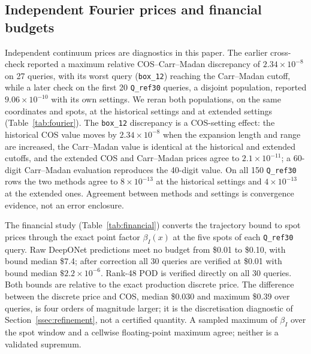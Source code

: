 \documentclass[11pt]{amsart}
\theoremstyle{remark}
\begin{document}


\subsection{Independent Fourier prices and financial budgets}
\label{ssec:fourier-financial}

Independent continuum prices are diagnostics in this paper. The earlier
cross-check reported a maximum relative COS--Carr--Madan discrepancy of
$2.34\times10^{-8}$ on 27 queries, with its worst query (\texttt{box\_12})
reaching the Carr--Madan cutoff, while a later check on the first 20 \texttt{Q\_ref30} queries, a
disjoint population, reported $9.06\times10^{-10}$ with its own settings. We reran both populations, on the same
coordinates and spots, at the historical settings and at extended settings
(Table~\ref{tab:fourier}). The \texttt{box\_12} discrepancy is a COS-setting
effect: the historical COS value moves by $2.34\times10^{-8}$ when the
expansion length and range are increased, the Carr--Madan value is identical
at the historical and extended cutoffs, and the extended COS and
Carr--Madan prices agree to $2.1\times10^{-11}$; a 60-digit Carr--Madan evaluation
reproduces the 40-digit value. On all 150 \texttt{Q\_ref30} rows the two
methods agree to $8\times10^{-13}$ at the historical settings and
$4\times10^{-13}$ at the extended ones. Agreement between methods and settings is convergence evidence,
not an error enclosure.



The financial study (Table~\ref{tab:financial}) converts the trajectory
bound to spot prices through the exact point factor $\beta_I(x)$ at the
five spots of each \texttt{Q\_ref30} query. Raw DeepONet predictions meet no
budget from \$0.01 to \$0.10, with bound median \$7.4; after correction all
30 queries are verified at \$0.01 with bound median $\$2.2\times10^{-6}$.
Rank-48 POD is verified directly on all 30 queries. Both bounds are
relative to the exact production discrete price. The difference between the
discrete price and COS, median \$0.030 and maximum \$0.39 over queries, is
four orders of magnitude larger; it is the discretisation diagnostic of
Section~\ref{ssec:refinement}, not a certified quantity. A sampled maximum
of $\beta_I$ over the spot window and a cellwise floating-point maximum
agree; neither is a validated supremum.


\end{document}
